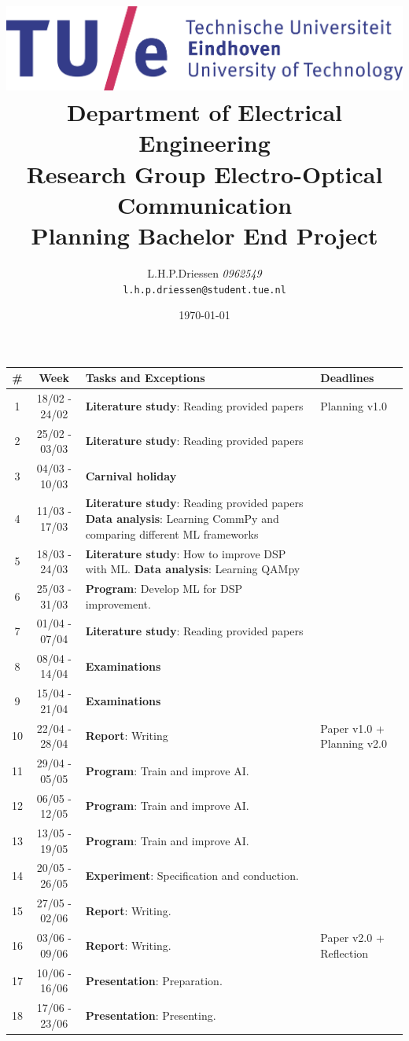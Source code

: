 \documentclass[a4paper]{article}
\title{\includegraphics[width=0.8\linewidth]{images/tue-logo-high}\\\large{Department of Electrical Engineering\\Research Group Electro-Optical Communication}\\\vspace{0.5cm}\LARGE{Planning Bachelor End Project}}
\author{L.H.P.Driessen \textit{0962549}\\\texttt{l.h.p.driessen@student.tue.nl}}
\date{\today}
\begin{document}
\maketitle
\begin{longtable}{c|c|p{5cm}|p{2.5cm}}
    \label{tab:Planning}
    \# & Week & Tasks and Exceptions & Deadlines \\
    \hline
    1 & 18/02 - 24/02 & \textbf{Literature study}: Reading provided papers & Planning v1.0\\
    \hline
    2 & 25/02 - 03/03 & \textbf{Literature study}: Reading provided papers & \\
    \hline
    3 & 04/03 - 10/03 & \textbf{Carnival holiday} & \\
    \hline
    4 & 11/03 - 17/03 & \textbf{Literature study}: Reading provided papers \newline\textbf{Data analysis}: Learning CommPy and comparing different ML frameworks & \\
    \hline
    5 & 18/03 - 24/03 & \textbf{Literature study}: How to improve DSP with ML. \newline\textbf{Data analysis}: Learning QAMpy & \\
    \hline
    6 & 25/03 - 31/03 & \textbf{Program}: Develop ML for DSP improvement. & \\
    \hline
    7 & 01/04 - 07/04 & \textbf{Literature study}: Reading provided papers & \\
    \hline
    8 & 08/04 - 14/04 & \textbf{Examinations} & \\
    \hline
    9 & 15/04 - 21/04 & \textbf{Examinations} & \\
    \hline
    10 & 22/04 - 28/04 & \textbf{Report}: Writing & Paper v1.0 + Planning v2.0\\
    \hline
    11 & 29/04 - 05/05 & \textbf{Program}: Train and improve AI. & \\
    \hline
    12 & 06/05 - 12/05 & \textbf{Program}: Train and improve AI. & \\
    \hline
    13 & 13/05 - 19/05 & \textbf{Program}: Train and improve AI. & \\
    \hline
    14 & 20/05 - 26/05 & \textbf{Experiment}: Specification and conduction. & \\
    \hline
    15 & 27/05 - 02/06 & \textbf{Report}: Writing. & \\
    \hline
    16 & 03/06 - 09/06 & \textbf{Report}: Writing. & Paper v2.0 + Reflection\\
    \hline
    17 & 10/06 - 16/06 & \textbf{Presentation}: Preparation. & \\
    \hline
    18 & 17/06 - 23/06 & \textbf{Presentation}: Presenting. & \\
\end{longtable}
\end{document}
